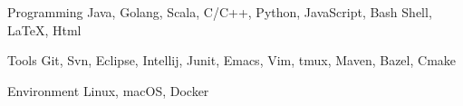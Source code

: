 

\begin{cvskills}

  \cvskill
    {Programming} %
    {Java, Golang, Scala, C/C++, Python, JavaScript, Bash Shell, LaTeX, Html} %

  \cvskill
    {Tools} %
    {Git, Svn, Eclipse, Intellij, Junit, Emacs, Vim, tmux, Maven, Bazel, Cmake} %

  \cvskill
    {Environment} %
    {Linux, macOS, Docker} %

\end{cvskills}
